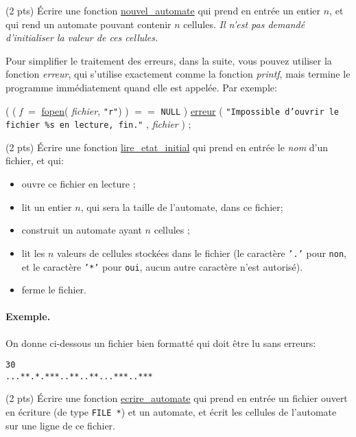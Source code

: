 \question (2 pts) {\'E}crire une fonction \url{nouvel_automate} qui
prend en entr{\'e}e un entier $n$, et qui rend un automate pouvant
contenir $n$ cellules. \textit{Il n'est pas demand{\'e} d'initialiser la
  valeur de ces cellules.}


Pour simplifier le traitement des erreurs, dans la suite, vous pouvez
utiliser la fonction \emph{erreur}, qui s'utilise exactement comme la
fonction \emph{printf}, mais termine le programme imm{\'e}diatement quand
elle est appel{\'e}e. Par exemple:

\begin{Ccode}
  \ctab \cif ( ( \emph{f} $=$ \url{fopen}( \emph{fichier}, \texttt{"r"}) ) $==$ \texttt{NULL} )
  \ctab\hspace*{2em}  \url{erreur} ( \texttt{"Impossible d'ouvrir le fichier \%s en lecture, fin."} , \emph{fichier} ) ;
\end{Ccode}



\question (2 pts) {\'E}crire une fonction \url{lire_etat_initial} qui
prend en entr{\'e}e le \emph{nom} d'un fichier, et qui:
\begin{itemize}
\item ouvre ce fichier en lecture ;
\item lit un entier $n$, qui sera la taille de l'automate, dans ce fichier;
\item construit un automate ayant $n$ cellules ;
\item lit les $n$ valeurs de cellules stock{\'e}es dans le fichier 
(le caract{\`e}re \texttt{'.'} pour \texttt{non}, et le caract{\`e}re 
\texttt{'*'} pour \texttt{oui}, aucun autre caract{\`e}re n'est autoris{\'e}).
\item ferme le fichier.
\end{itemize}

\paragraph{Exemple.} On donne ci-dessous un fichier bien formatt{\'e} qui doit {\^e}tre lu sans erreurs:
\begin{verbatim}
30
...**.*.***..**..**...***..***
\end{verbatim}

\question (2 pts) {\'E}crire une fonction \url{ecrire_automate} qui
prend en entr{\'e}e un fichier ouvert en {\'e}criture (de type \texttt{FILE
*}) et un automate, et {\'e}crit les cellules de l'automate sur une ligne
de ce fichier.



